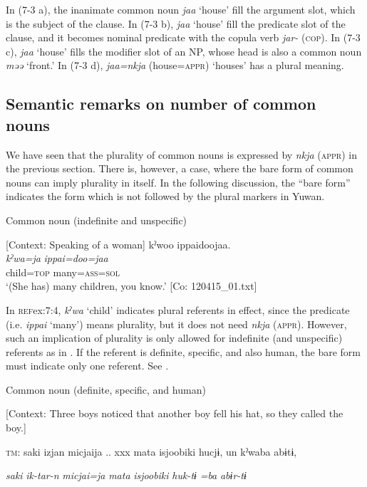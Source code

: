 In (7-3 a), the inanimate common noun \textit{jaa} ‘house’ fill the argument slot, which is the subject of the clause. In (7-3 b), \textit{jaa} ‘house’ fill the predicate slot of the clause, and it becomes nominal predicate with the copula verb \textit{jar-} (\textsc{cop}). In (7-3 c), \textit{jaa} ‘house’ fills the modifier slot of an NP, whose head is also a common noun \textit{məə} ‘front.’ In (7-3 d), \textit{jaa=nkja} (house=\textsc{appr}) ‘houses’ has a plural meaning.

\subsection{Semantic remarks on number of common nouns}

We have seen that the plurality of common nouns is expressed by \textit{nkja} (\textsc{appr}) in the previous section. There is, however, a case, where the bare form of common nouns can imply plurality in itself. In the following discussion, the “bare form” indicates the form which is not followed by the plural markers in Yuwan.

\ea \label{ex:7:4}  Common noun (indefinite and unspecific)

  [Context: Speaking of a woman]
\glll  kˀwoo  ippaidoojaa.\\
\textit{kˀwa=ja}  \textit{ippai=doo=jaa}\\
child=\textsc{top}  many=\textsc{ass}=\textsc{sol}\\
\glt ‘(She has) many children, you know.’ [Co: 120415\_01.txt]
\z

In \textsc{ref}{ex:7:4}, \textit{kˀwa} ‘child’ indicates plural referents in effect, since the predicate (i.e. \textit{ippai} ‘many’) means plurality, but it does not need \textit{nkja} (\textsc{appr}). However, such an implication of plurality is only allowed for indefinite (and unspecific) referents as in . If the referent is definite, specific, and also human, the bare form must indicate only one referent. See .

\ea \label{ex:7:5}  Common noun (definite, specific, and human)

  [Context: Three boys noticed that another boy fell his hat, so they called the boy.]

  \textsc{tm}:  saki  izjan  micjaija ..  xxx  mata  isjoobiki  hucjɨ,  un  kˀwaba  abɨtɨ,

    \textit{saki}  \textit{ik-tar-n}  \textit{micjai=ja}    \textit{mata}  \textit{isjoobiki}  \textit{huk-tɨ}  \textit{}  \textit{=ba}  \textit{abɨr-tɨ}
                                                                                                                
